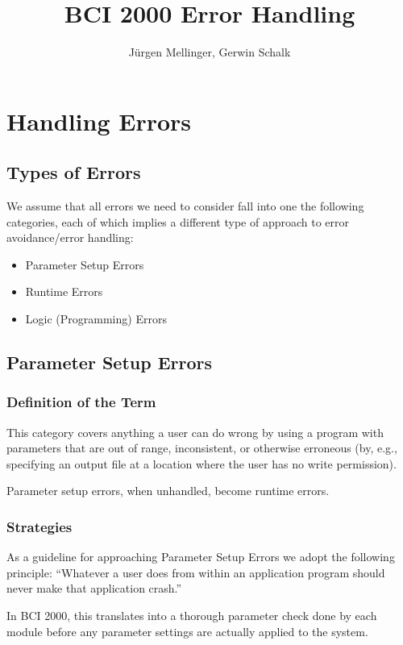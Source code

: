 \documentclass[12pt,letterpaper]{article}
\title{BCI 2000 Error Handling}
\author{J\"urgen Mellinger, Gerwin Schalk}
\begin{document}
\maketitle
\tableofcontents

\pagebreak
\section{Handling Errors}
\label{secHandl}
\subsection{Types of Errors}
We assume that all errors we need to consider fall 
into one the following categories, each of which
implies a different type of approach to error
avoidance/error handling:
\begin{itemize}
\item{Parameter Setup Errors}
\item{Runtime Errors}
\item{Logic (Programming) Errors}
\end{itemize}

\subsection{Parameter Setup Errors}

\subsubsection{Definition of the Term}

This category covers anything a user can do wrong
by using a program with parameters that are out of range,
inconsistent, or otherwise erroneous (by, e.g.,
specifying an output file at a location where the user
has no write permission).

Parameter setup errors, when unhandled, become runtime errors.

\subsubsection{Strategies}
\label{secParamcheck}

As a guideline for approaching Parameter Setup Errors
we adopt the following principle: ``Whatever a
user does from within an application program should never
make that application crash.''

In BCI 2000, this translates into a thorough parameter
check done by each module before any parameter settings are
actually applied to the system.
\end{document}
